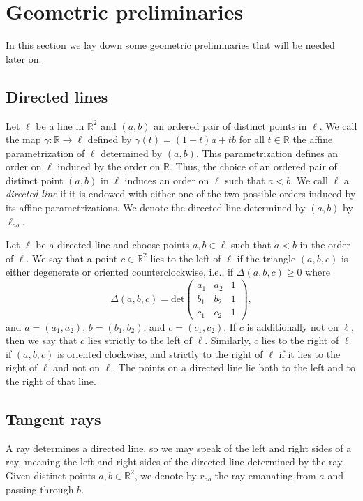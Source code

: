 \documentclass[11pt]{amsart}
\theoremstyle{remark}
\numberwithin{equation}{section}
\newcommand{\R}{\mathbb{R}}
\renewcommand{\geq}{\geqslant}
\begin{document}
\section{Geometric preliminaries}\label{geoprelims}
In this section we lay down  some  geometric preliminaries that will be needed later on. 


\subsection{Directed lines} 
Let $\ell$ be a line in $\R^2$ and $(a,b)$ an ordered pair of distinct points in $\ell$.  We call the map $\gamma\colon \R\to \ell$ defined by 
$\gamma(t)=(1-t)a+tb$ for all $t\in \R$ the affine parametrization of $\ell$ determined by $(a,b)$. This parametrization defines an order 
on $\ell$ induced by the order on $\R$. Thus, the choice of an ordered pair of distinct point $(a,b)$ in  $\ell$ induces an order on $\ell$ such that $a<b$.
 We call $\ell$ a \emph{directed line} if it is endowed with either one of the two possible orders induced by its affine parametrizations. We denote the directed line 
 determined by $(a,b)$ by $\ell_{ab}$.

 Let $\ell$ be a directed line and choose points $a,b\in\ell$ such that $a<b$ in the order of $\ell$. We say that a point $c\in \R^2$ lies to the left of $\ell$ if the triangle $(a,b,c)$ is either degenerate or oriented counterclockwise, i.e., if $\Delta(a,b,c)\geq 0$ where 
\[
\Delta(a,b,c)=\mathrm{det}
\begin{pmatrix}
a_1 & a_2 & 1\\
b_1 & b_2 & 1\\
c_1 & c_2 & 1
\end{pmatrix},
\]
and $a=(a_1,a_2)$, $b=(b_1,b_2)$, and $c=(c_1,c_2)$.
If $c$ is additionally not on $\ell$, then we say that $c$ lies strictly to the left of  $\ell$.
Similarly, $c$ lies to the right of $\ell$ if $(a,b,c)$ is oriented clockwise, and strictly to the right of $\ell$ if it lies to the right of $\ell$ and not on $\ell$. The points on a directed line lie both to the left and to the right of that line. 


\subsection{Tangent rays}\label{righttangent}
A ray determines a directed line, so we may speak of the left and right sides of a ray, meaning the left and right sides of the directed line determined by the ray. Given distinct points $a,b\in \R^2$, we denote by $r_{ab}$ the ray emanating from $a$ and passing through $b$.
\end{document}
